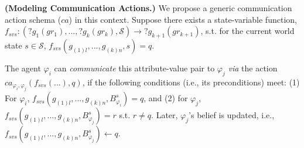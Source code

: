 \documentclass[letterpaper]{article} %
\begin{document}
\noindent \textbf{(Modeling Communication Actions.)} 
% 
We propose a generic communication action schema ($ca$) in this context. 
Suppose there exists a state-variable function,  $f_{svs}:(?g_1 (gr_1),..., ?g_k (gr_k),\mathcal{S}) \rightarrow ?g_{k+1} (gr_{k+1})$, s.t. for the current world state $s \in \mathcal{S}$, 
$f_{\textit{svs}}(g_{(1)l},...,g_{(k)n},s) = q$.

The agent $\varphi_i$ can \textit{communicate} 
this attribute-value pair to $\varphi_j$ \textit{via} the action $ca_{\varphi_i, \varphi_j}(f_{\textit{svs}}(...),q)$, if the following conditions (i.e., its preconditions) meet: 
(1) For $\varphi_i$, 
$f_{\textit{svs}}(g_{(1)l},...,g_{(k)n},B_{\varphi_i}^s) = q$, and (2) for $\varphi_j$,
$f_{\textit{svs}}(g_{(1)l},...,g_{(k)n},B_{\varphi_j}^s) = r$ s.t.
$r \neq q$.
Later, $\varphi_j$'s belief is updated, i.e., $f_{\textit{svs}}(g_{(1)l},...,g_{(k)n},B_{\varphi_j}^s) \leftarrow q$. 



\end{document}
